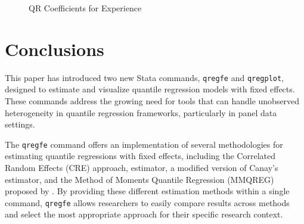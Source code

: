 \documentclass[bib]{statapress}
\begin{document}
\begin{figure}[H]


\caption{\label{fig-ttl-exp}QR Coefficients for Experience}

\end{figure}%

\section{Conclusions}\label{sec:conclusions}

This paper has introduced two new Stata commands, \texttt{qregfe} and
\texttt{qregplot}, designed to estimate and visualize quantile
regression models with fixed effects. These commands address the growing
need for tools that can handle unobserved heterogeneity in quantile
regression frameworks, particularly in panel data settings.

The \texttt{qregfe} command offers an implementation of several
methodologies for estimating quantile regressions with fixed effects,
including the Correlated Random Effects (CRE) approach,
\citet{canay2011} estimator, a modified version of Canay's estimator,
and the Method of Moments Quantile Regression (MMQREG) proposed by
\citet{mss2019}. By providing these different estimation methods within
a single command, \texttt{qregfe} allows researchers to easily compare
results across methods and select the most appropriate approach for
their specific research context.
\end{document}
